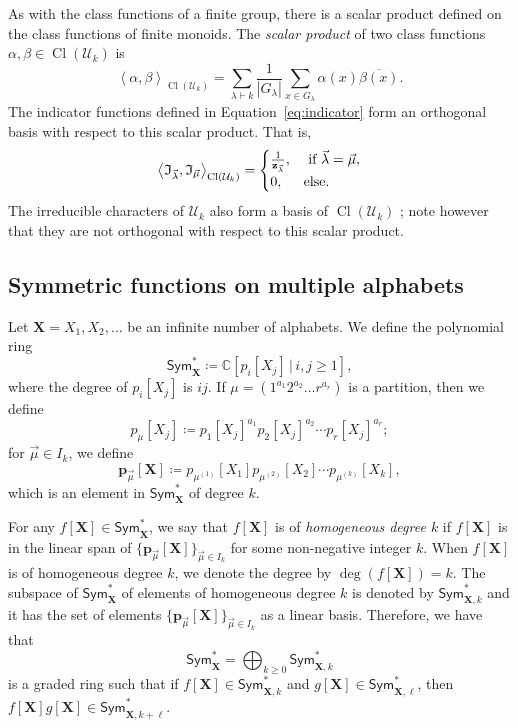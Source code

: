\documentclass[10pt]{amsart}
\theoremstyle{definition}
\theoremstyle{remark}
\newcommand{\defncolor}{\color{darkred}}
\newcommand{\defn}[1]{{\defncolor\emph{#1}}} %
\newcommand{\CC}{\mathbb C}
\newcommand{\ind}{\mathfrak{I}}
\newcommand{\XXX}{\mathbf{X}}
\newcommand{\class}{\operatorname{Cl}}
\begin{document}
As with the class functions of a finite group, there is a scalar product
defined on the class functions of finite monoids.
The \defn{scalar product} of two class functions $\alpha, \beta \in \class(\mathcal{U}_k)$
is
\begin{equation}\label{eq:defspclass}
\left< \alpha, \beta \right>_{\class(\mathcal{U}_k)} =
\sum_{\lambda \vdash k} \frac{1}{|G_{\lambda}|} \sum_{x \in G_{\lambda}} \alpha(x) \overline{\beta(x)}.
\end{equation}
The indicator functions defined in Equation~\ref{eq:indicator} form an orthogonal basis
with respect to this scalar product.  That is,
$$
    \left< \ind_{\vec{\lambda}}, \ind_{\vec{\mu}} \right>_{\class(\mathcal{U}_k)}
    = \begin{cases}\frac{1}{\mathbf{z}_{\vec{\lambda}}}, &\hbox{ if }\vec{\lambda} = \vec{\mu},\\
    0, & \hbox{else.}\end{cases}
$$
The irreducible characters of $\mathcal{U}_k$ also form a basis of $\class(\mathcal{U}_k)$
\cite[Proposition 7.9 and 7.10]{Steinberg.2016};
note however that they are not orthogonal with respect to this
scalar product.

\subsection{Symmetric functions on multiple alphabets}
Let $\XXX = X_1, X_2, \ldots$ be an infinite number of alphabets.  We define the polynomial ring
\[
    \mathsf{Sym}^\ast_\XXX \coloneqq \CC[p_i[X_j]\, |\, i,j\geqslant 1],
\]
where the degree of $p_i[X_j]$ is $ij$.  If $\mu = (1^{a_1}2^{a_2}\ldots r^{a_r})$ is a partition,
then we define
$$p_\mu[X_j] \coloneqq p_1[X_j]^{a_1} p_2[X_j]^{a_2} \cdots p_r[X_j]^{a_r};$$
for $\vec{\mu} \in I_k$, we define
$$\mathbf{p}_{\vec{\mu}}[\XXX] \coloneqq p_{\mu^{(1)}}[X_1] p_{\mu^{(2)}}[X_2] \cdots p_{\mu^{(k)}}[X_k],$$
which is an element in $\mathsf{Sym}^\ast_\XXX$ of degree $k$.

For any $f[\XXX] \in \mathsf{Sym}^\ast_\XXX$, we say that $f[\XXX]$ is of \defn{homogeneous
degree $k$} if
$f[\XXX]$ is in the linear span of $\{ \mathbf{p}_{\vec{\mu}}[\XXX] \}_{\vec{\mu} \in I_k}$
for some non-negative integer $k$.
When $f[\XXX]$ is of homogeneous degree $k$, we denote the degree by $\deg(f[\XXX]) = k$.
The subspace of $\mathsf{Sym}^\ast_\XXX$ of elements of homogeneous degree $k$ is denoted by
$\mathsf{Sym}^\ast_{\XXX,k}$ and it has the set of elements $\{ \mathbf{p}_{\vec{\mu}}[\XXX] \}_{\vec{\mu} \in I_k}$ as a linear basis. Therefore, we have that
\[
    \mathsf{Sym}^\ast_\XXX = \bigoplus_{k \geqslant 0} \mathsf{Sym}^\ast_{\XXX,k}
\]
is a graded ring such that if $f[\XXX] \in \mathsf{Sym}^\ast_{\XXX,k}$ and $g[\XXX] \in \mathsf{Sym}^\ast_{\XXX,\ell}$, then $f[\XXX] g[\XXX] \in 
\mathsf{Sym}^\ast_{\XXX,k+\ell}$.
\end{document}
